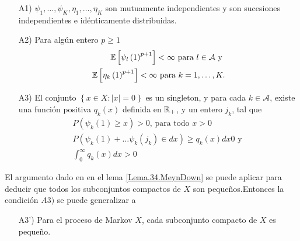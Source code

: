 \begin{Sup}
\begin{itemize}
\item[A1)] $\psi_{1},\ldots,\psi_{K},\eta_{1},\ldots,\eta_{K}$ son
mutuamente independientes y son sucesiones independientes e
id\'enticamente distribuidas.

\item[A2)] Para alg\'un entero $p\geq1$
\begin{eqnarray*}
\mathbb{E}\left[\psi_{l}\left(1\right)^{p+1}\right]<\infty\textrm{ para }l\in\mathcal{A}\textrm{ y }\\
\mathbb{E}\left[\eta_{k}\left(1\right)^{p+1}\right]<\infty\textrm{ para
}k=1,\ldots,K.
\end{eqnarray*}
\item[A3)] El conjunto $\left\{x\in X:|x|=0\right\}$ es un
singleton, y para cada $k\in\mathcal{A}$, existe una funci\'on
positiva $q_{k}\left(x\right)$ definida en $\mathbb{R}_{+}$, y un entero
$j_{k}$, tal que
\begin{eqnarray}
P\left(\psi_{k}\left(1\right)\geq x\right)>0\textrm{, para todo }x>0\\
P\left(\psi_{k}\left(1\right)+\ldots\psi_{k}\left(j_{k}\right)\in dx\right)\geq q_{k}\left(x\right)dx0\textrm{ y }\\
\int_{0}^{\infty}q_{k}\left(x\right)dx>0
\end{eqnarray}
\end{itemize}
\end{Sup}

El argumento dado en \cite{MaynDown} en el lema
\ref{Lema.34.MeynDown} se puede aplicar para deducir que todos los
subconjuntos compactos de $X$ son peque\~nos.Entonces la
condici\'on $A3)$ se puede generalizar a
\begin{itemize}
\item[A3')] Para el proceso de Markov $X$, cada subconjunto
compacto de $X$ es peque\~no.
\end{itemize}

